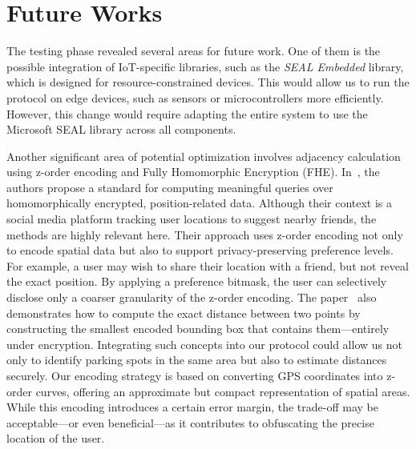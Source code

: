\section{Future Works}

The testing phase revealed several areas for future work. One of them is the possible integration of IoT-specific libraries, such as the \emph{SEAL Embedded} \cite{sealembedded} library, which is designed for resource-constrained devices. This would allow us to run the protocol on edge devices, such as sensors or microcontrollers more efficiently. However, this change would require adapting the entire system to use the Microsoft SEAL\cite{sealcrypto} library across all components.

Another significant area of potential optimization involves adjacency calculation using z-order encoding and Fully Homomorphic Encryption (FHE). In~\cite{zhang2020privacy}, the authors propose a standard for computing meaningful queries over homomorphically encrypted, position-related data. Although their context is a social media platform tracking user locations to suggest nearby friends, the methods are highly relevant here. Their approach uses z-order encoding not only to encode spatial data but also to support privacy-preserving preference levels.
For example, a user may wish to share their location with a friend, but not reveal the exact position. By applying a preference bitmask, the user can selectively disclose only a coarser granularity of the z-order encoding. The paper~\cite{zhang2020privacy} also demonstrates how to compute the exact distance between two points by constructing the smallest encoded bounding box that contains them—entirely under encryption. Integrating such concepts into our protocol could allow us not only to identify parking spots in the same area but also to estimate distances securely.
Our encoding strategy is based on converting GPS coordinates into z-order curves, offering an approximate but compact representation of spatial areas. While this encoding introduces a certain error margin, the trade-off may be acceptable—or even beneficial—as it contributes to obfuscating the precise location of the user.
